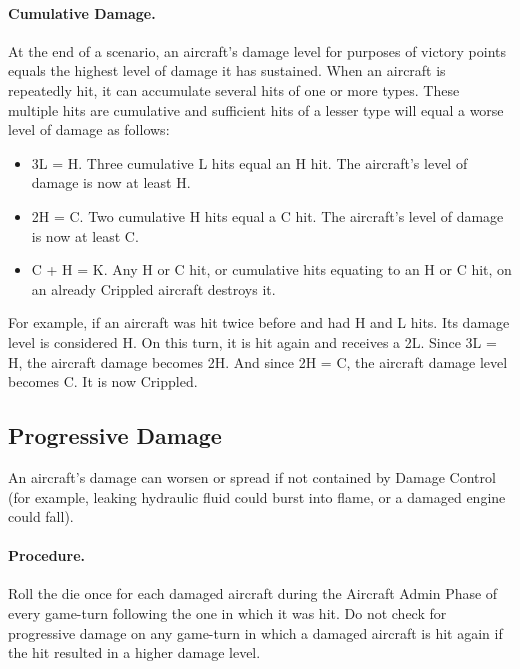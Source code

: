 \paragraph{Cumulative Damage.} At the end of a scenario, an aircraft's damage level for purposes of victory points equals the highest level of damage it has sustained. When an aircraft is repeatedly hit, it can accumulate several hits of one or more types. These multiple hits are cumulative and sufficient hits of a lesser type will equal a worse level of damage as follows:

\begin{itemize}

    \item 3L = H. Three cumulative L hits equal an H hit. The aircraft's level of damage is now at least H.

    \item 2H = C. Two cumulative H hits equal a C hit. The aircraft's level of damage is now at least C.

    \item C + H = K. Any H or C hit, or cumulative hits equating to an H or C hit, on an already Crippled aircraft destroys it.
    
\end{itemize}

For example, if an aircraft was hit twice before and had H and L hits. Its damage level is considered H. On this turn, it is hit again and receives a 2L. Since 3L = H, the aircraft damage becomes 2H. And since 2H = C, the aircraft damage level becomes C. It is now Crippled.


\advancedrules

\subsection{Progressive Damage}


An aircraft's damage can worsen or spread if not contained by Damage Control (for example, leaking hydraulic fluid could burst into flame, or a damaged engine could fall).

\paragraph{Procedure.} Roll the die once for each damaged aircraft during the Aircraft Admin Phase of every game-turn following the one in which it was hit. Do not check for progressive damage on any game-turn in which a damaged aircraft is hit again if the hit resulted in a higher damage level.


